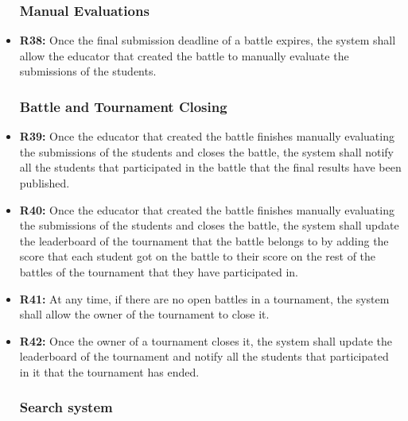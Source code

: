 \documentclass{article}
\begin{document}
\begin{itemize}
    \subsubsection*{Manual Evaluations}

    \item \textbf{R38:} Once the final submission deadline of a battle expires, the system shall allow the educator that created the battle to manually evaluate the submissions of the students.
    
    \subsubsection*{Battle and Tournament Closing}

    \item \textbf{R39:} Once the educator that created the battle finishes manually evaluating the submissions of the students and closes the battle, the system shall notify all the students that participated in the battle that the final results have been published.
    \item \textbf{R40:} Once the educator that created the battle finishes manually evaluating the submissions of the students and closes the battle, the system shall update the leaderboard of the tournament that the battle belongs to by adding the score that each student got on the battle to their score on the rest of the battles of the tournament that they have participated in.
    \item \textbf{R41:} At any time, if there are no open battles in a tournament, the system shall allow the owner of the tournament to close it.
    \item \textbf{R42:} Once the owner of a tournament closes it, the system shall update the leaderboard of the tournament and notify all the students that participated in it that the tournament has ended.
    
    \subsubsection*{Search system}


\end{itemize}
\end{document}
